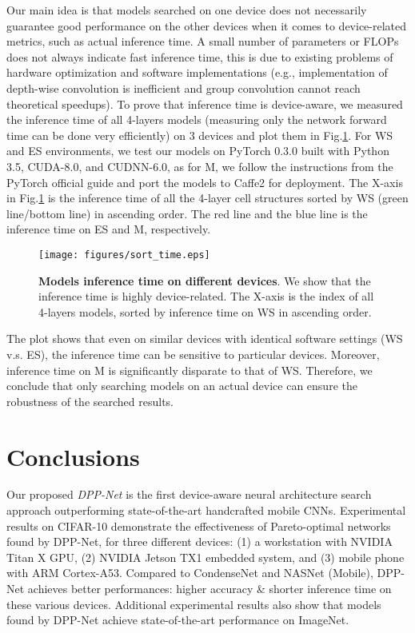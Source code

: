 \documentclass[runningheads]{llncs}
\def\eg{e.g.}
\begin{document}
Our main idea is that models searched on one device does not necessarily guarantee good performance on the other devices when it comes to device-related metrics, such as actual inference time. A small number of parameters or FLOPs does not always indicate fast inference time, this is due to existing problems of hardware optimization and software implementations (\eg, implementation of depth-wise convolution is inefficient and group convolution cannot reach theoretical speedups). To prove that inference time is device-aware, we measured the inference time of all 4-layers models (measuring only the network forward time can be done very efficiently) on 3 devices and plot them in Fig.\ref{fig.sort_time}. For WS and ES environments, we test our models on PyTorch 0.3.0 \cite{paszke2017automatic} built with Python 3.5, CUDA-8.0, and CUDNN-6.0, as for M, we follow the instructions from the PyTorch official guide and port the models to Caffe2 for deployment. The X-axis in Fig.\ref{fig.sort_time} is the inference time of all the 4-layer cell structures sorted by WS (green line/bottom line) in ascending order. The red line and the blue line is the inference time on ES and M, respectively.

\begin{figure}[h]
\begin{center}
\texttt{[image: figures/sort\_time.eps]}
\end{center}
\caption{\textbf{Models inference time on different devices}.
We show that the inference time is highly device-related. The X-axis is the index of all 4-layers models, sorted by inference time on WS in ascending order.}
\label{fig.sort_time}
\end{figure}

The plot shows that even on similar devices with identical software settings (WS v.s. ES), the inference time can be sensitive to particular devices. Moreover, inference time on M is significantly disparate to that of WS. Therefore, we conclude that only searching models on an actual device can ensure the robustness of the searched results.

\section{Conclusions}

Our proposed \textit{DPP-Net} is the first device-aware neural architecture search approach outperforming state-of-the-art handcrafted mobile CNNs.
Experimental results on CIFAR-10 demonstrate the effectiveness of Pareto-optimal networks found by DPP-Net, for three different devices: (1) a workstation with NVIDIA Titan X GPU, (2) NVIDIA Jetson TX1 embedded system, and (3) mobile phone with ARM Cortex-A53. Compared to CondenseNet and NASNet (Mobile), DPP-Net achieves better performances: higher accuracy \& shorter inference time on these various devices. Additional experimental results also show that models found by DPP-Net achieve state-of-the-art performance on ImageNet.
%
\end{document}
